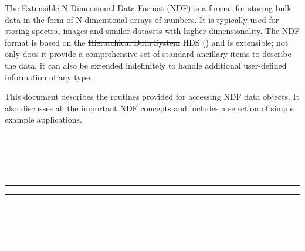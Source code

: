 The \st{Extensible N-Dimensional Data Format\/} (NDF) is a format for
storing bulk data in the form of N-dimensional arrays of numbers. It
is typically used for storing spectra, images and similar datasets
with higher dimensionality. The NDF format is based on the
\st{Hierarchical Data System\/} HDS () and is
extensible; not only does it provide a comprehensive set of standard
ancillary items to describe the data, it can also be extended
indefinitely to handle additional user-defined information of any
type.

This document describes the routines provided for accessing NDF data
objects. It also discusses all the important NDF concepts and includes
a selection of simple example applications.
 \newpage
 \begin{latexonly}
   \null\vspace {5mm}
   \begin {center}
   \rule{80mm}{0.5mm} \\ [1ex]
   {\Large\bf \stardoctitle \\ [2.5ex]
              \stardocversion} \\ [2ex]
   \rule{80mm}{0.5mm}
   \end{center}
   \setlength{\parskip}{0mm}
   \latexonlytoc
   \setlength{\parskip}{\medskipamount}
   \markright{\stardocname}
 \end{latexonly}
\newpage
\renewcommand{\thepage}{\arabic{page}}
\setcounter{page}{1}
\begin{latexonly}
   \null\vspace {5mm}
   \begin {center}
   \rule{80mm}{0.5mm} \\ [1ex]
   {\Large\bf \stardoctitle \\ [2.5ex]
              \stardocversion} \\ [2ex]
   \rule{80mm}{0.5mm}
   \end{center}

   \vspace{30mm}
\end{latexonly}

